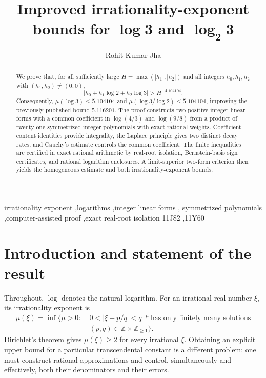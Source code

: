 \documentclass[preprint,12pt]{elsarticle}
\theoremstyle{definition}
\begin{document}
\begin{frontmatter}

\title{Improved irrationality-exponent bounds for
$\boldsymbol{\log 3}$ and $\boldsymbol{\log_2 3}$}

\author{Rohit Kumar Jha}

\begin{abstract}
We prove that, for all sufficiently large
$H=\max(|h_1|,|h_2|)$ and all integers $h_0,h_1,h_2$ with
$(h_1,h_2)\ne(0,0)$,
\[
 |h_0+h_1\log2+h_2\log3|>H^{-4.104104}.
\]
Consequently,
$\mu(\log3)\le5.104104$ and
$\mu(\log3/\log2)\le5.104104$, improving the previously published
bound $5.116201$.  The proof constructs two positive integer linear forms
with a common coefficient in $\log(4/3)$ and $\log(9/8)$ from a product of
twenty-one symmetrized integer polynomials with exact rational weights.
Coefficient-content identities provide integrality, the Laplace principle
gives two distinct decay rates, and Cauchy's estimate controls the common
coefficient.  The finite inequalities are certified in exact rational
arithmetic by real-root isolation, Bernstein-basis sign certificates, and
rational logarithm enclosures.  A limit-superior two-form criterion then
yields the homogeneous estimate and both irrationality-exponent bounds.
\end{abstract}

\begin{keyword}
irrationality exponent \sep logarithms \sep integer linear forms \sep
symmetrized polynomials \sep computer-assisted proof \sep exact real-root isolation
\MSC[2020] 11J82 \sep 11Y60
\end{keyword}

\end{frontmatter}

\section{Introduction and statement of the result}

Throughout, $\log$ denotes the natural logarithm.  For an irrational real
number $\xi$, its irrationality exponent is
\[
\begin{aligned}
 \mu(\xi)=\inf\bigl\{\mu>0:\;&
 0<|\xi-p/q|<q^{-\mu}\ \text{has only finitely many solutions}\\
 & (p,q)\in\mathbb Z\times\mathbb Z_{\ge1}\bigr\}.
\end{aligned}
\]
Dirichlet's theorem gives $\mu(\xi)\ge2$ for every irrational $\xi$.
Obtaining an explicit upper bound for a particular transcendental constant is
a different problem: one must construct rational approximations and control,
simultaneously and effectively, both their denominators and their errors.
\end{document}
